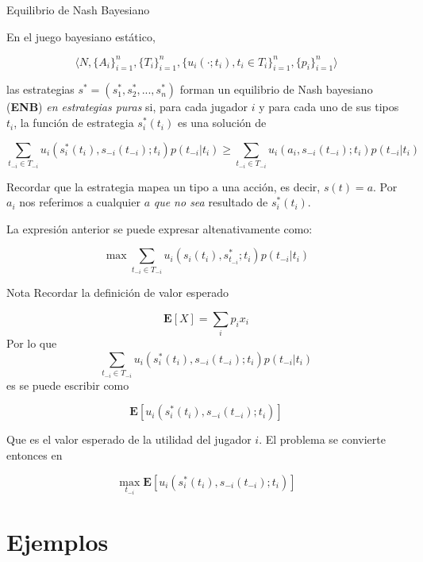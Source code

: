 \documentclass[12pt]{article}
\begin{document}
\begin{mybox}{Equilibrio de Nash Bayesiano}
	\begin{defi}
		En el juego bayesiano estático,

		\[ \langle N, \{A_i \}_{i=1}^n, \{ T_i \}_{i=1}^n, \{u_i(\cdot; t_i ), t_i \in T_i\}_{i=1}^n, \{ p_i \}_{i=1}^n \rangle \]

		las estrategias $s^* = (s_1^*, s_2^*, ..., s_n^*)$ forman un equilibrio de Nash bayesiano (\textbf{ENB}) \textit{en estrategias puras} si, para cada jugador $i$ y para cada uno de sus tipos $t_i$, la función de estrategia $s_i^*(t_i)$ es una solución de

		\[ \sum_{t_{-i} \in T_{-i}} u_i(s_i^*(t_i), s_{-i}(t_{-i}); t_i)p(t_{-i} | t_i) \geq
			\sum_{t_{-i} \in T_{-i}} u_i(a_i, s_{-i}(t_{-i}); t_i)p(t_{-i} | t_i)
		\]

		Recordar que la estrategia mapea un tipo a una acción, es decir, $s(t) = a$. Por $a_i$ nos referimos a cualquier {\color{blue}$a$} \textit{que no sea} resultado de $s_{i}^*(t_i)$.

		La expresión anterior se puede expresar altenativamente como:

		\[\max \sum_{t_{-i} \in T_{-i}} u_i(s_i(t_i), s_{t_{-i}}^*; t_i)p(t_{-i} | t_i) \]

	\end{defi}
\end{mybox}

\begin{summarybox}[colback=red!15]{Nota}
	Recordar la definición de valor esperado

	\[
		\textbf{E}[X] = \sum_i p_i x_i
	\]
	Por lo que
	\[ \sum_{t_{-i} \in T_{-i}} u_i(s_i^*(t_i), s_{-i}(t_{-i}); t_i)p(t_{-i} | t_i) \]
	es se puede escribir como

	\[
		\textbf{E}[u_i(s_i^*(t_i), s_{-i}(t_{-i}); t_i)]
	\]

	Que es el valor esperado de la utilidad del jugador $i$. El problema se convierte entonces en

	\[
		\max_{t_{-i}} \textbf{E}[u_i(s_i^*(t_i), s_{-i}(t_{-i}); t_i)]
	\]

\end{summarybox}

\section{Ejemplos}
\end{document}
